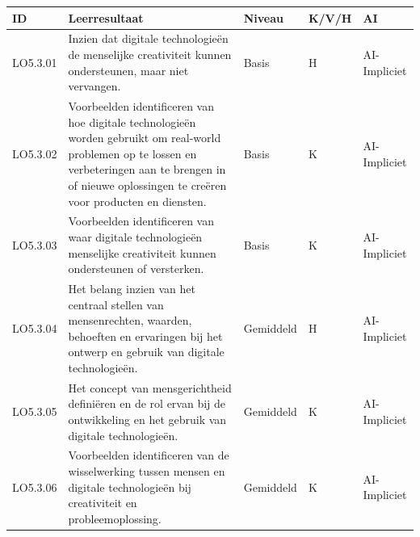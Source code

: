 \documentclass[
  dutch,
  letterpaper,
  DIV=11,
  numbers=noendperiod]{scrartcl}
\begin{document}
\begin{longtable}[]{@{}
  >{\centering\arraybackslash}p{}
  >{\centering\arraybackslash}p{}
  >{\centering\arraybackslash}p{}
  >{\centering\arraybackslash}p{}
  >{\centering\arraybackslash}p{}@{}}
\toprule\noalign{}
\begin{minipage}[b]{\linewidth}\centering
ID
\end{minipage} & \begin{minipage}[b]{\linewidth}\centering
Leerresultaat
\end{minipage} & \begin{minipage}[b]{\linewidth}\centering
Niveau
\end{minipage} & \begin{minipage}[b]{\linewidth}\centering
K/V/H
\end{minipage} & \begin{minipage}[b]{\linewidth}\centering
AI
\end{minipage} \\
\midrule\noalign{}
\endhead
\bottomrule\noalign{}
\endlastfoot
LO5.3.01 & Inzien dat digitale technologieën de menselijke creativiteit
kunnen ondersteunen, maar niet vervangen. & Basis & H & AI-Impliciet \\
LO5.3.02 & Voorbeelden identificeren van hoe digitale technologieën
worden gebruikt om real-world problemen op te lossen en verbeteringen
aan te brengen in of nieuwe oplossingen te creëren voor producten en
diensten. & Basis & K & AI-Impliciet \\
LO5.3.03 & Voorbeelden identificeren van waar digitale technologieën
menselijke creativiteit kunnen ondersteunen of versterken. & Basis & K &
AI-Impliciet \\
LO5.3.04 & Het belang inzien van het centraal stellen van mensenrechten,
waarden, behoeften en ervaringen bij het ontwerp en gebruik van digitale
technologieën. & Gemiddeld & H & AI-Impliciet \\
LO5.3.05 & Het concept van mensgerichtheid definiëren en de rol ervan
bij de ontwikkeling en het gebruik van digitale technologieën. &
Gemiddeld & K & AI-Impliciet \\
LO5.3.06 & Voorbeelden identificeren van de wisselwerking tussen mensen
en digitale technologieën bij creativiteit en probleemoplossing. &
Gemiddeld & K & AI-Impliciet \\

\end{longtable}
\end{document}

